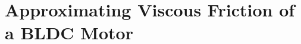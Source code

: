 
\cleardoublepage

\chapter{Approximating Viscous Friction of a BLDC Motor}
\label{chp4}

\begin{figure}[H]
	\begin{center}
		
	\end{center}
\end{figure}

\begin{figure}[H]
	\begin{center}
		
	\end{center}
\end{figure}

\begin{figure}[H]
	\begin{center}
		
	\end{center}
\end{figure}
